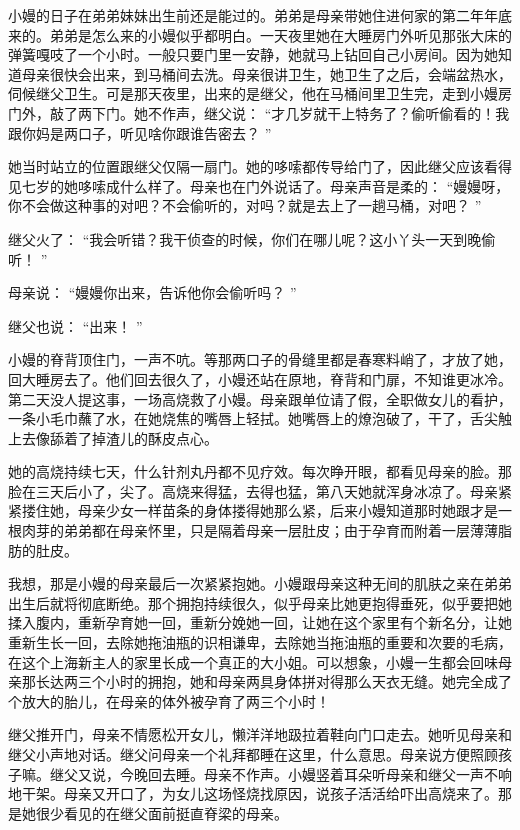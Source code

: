 \documentclass[12pt,twoside,openany]{book}
\begin{document}
小嫚的日子在弟弟妹妹出生前还是能过的。弟弟是母亲带她住进何家的第二年年底来的。弟弟是怎么来的小嫚似乎都明白。一天夜里她在大睡房门外听见那张大床的弹簧嘎吱了一个小时。一般只要门里一安静，她就马上钻回自己小房间。因为她知道母亲很快会出来，到马桶间去洗。母亲很讲卫生，她卫生了之后，会端盆热水，伺候继父卫生。可是那天夜里，出来的是继父，他在马桶间里卫生完，走到小嫚房门外，敲了两下门。她不作声，继父说： “才几岁就干上特务了？偷听偷看的！我跟你妈是两口子，听见啥你跟谁告密去？ ”

她当时站立的位置跟继父仅隔一扇门。她的哆嗦都传导给门了，因此继父应该看得见七岁的她哆嗦成什么样了。母亲也在门外说话了。母亲声音是柔的： “嫚嫚呀，你不会做这种事的对吧？不会偷听的，对吗？就是去上了一趟马桶，对吧？ ”

继父火了： “我会听错？我干侦查的时候，你们在哪儿呢？这小丫头一天到晚偷听！ ”

母亲说： “嫚嫚你出来，告诉他你会偷听吗？ ”

继父也说： “出来！ ”

小嫚的脊背顶住门，一声不吭。等那两口子的骨缝里都是春寒料峭了，才放了她，回大睡房去了。他们回去很久了，小嫚还站在原地，脊背和门扉，不知谁更冰冷。第二天没人提这事，一场高烧救了小嫚。母亲跟单位请了假，全职做女儿的看护，一条小毛巾蘸了水，在她烧焦的嘴唇上轻拭。她嘴唇上的燎泡破了，干了，舌尖触上去像舔着了掉渣儿的酥皮点心。

她的高烧持续七天，什么针剂丸丹都不见疗效。每次睁开眼，都看见母亲的脸。那脸在三天后小了，尖了。高烧来得猛，去得也猛，第八天她就浑身冰凉了。母亲紧紧搂住她，母亲少女一样苗条的身体搂得她那么紧，后来小嫚知道那时她跟才是一根肉芽的弟弟都在母亲怀里，只是隔着母亲一层肚皮；由于孕育而附着一层薄薄脂肪的肚皮。

我想，那是小嫚的母亲最后一次紧紧抱她。小嫚跟母亲这种无间的肌肤之亲在弟弟出生后就将彻底断绝。那个拥抱持续很久，似乎母亲比她更抱得垂死，似乎要把她揉入腹内，重新孕育她一回，重新分娩她一回，让她在这个家里有个新名分，让她重新生长一回，去除她拖油瓶的识相谦卑，去除她当拖油瓶的重要和次要的毛病，在这个上海新主人的家里长成一个真正的大小姐。可以想象，小嫚一生都会回味母亲那长达两三个小时的拥抱，她和母亲两具身体拼对得那么天衣无缝。她完全成了个放大的胎儿，在母亲的体外被孕育了两三个小时！

继父推开门，母亲不情愿松开女儿，懒洋洋地趿拉着鞋向门口走去。她听见母亲和继父小声地对话。继父问母亲一个礼拜都睡在这里，什么意思。母亲说方便照顾孩子嘛。继父又说，今晚回去睡。母亲不作声。小嫚竖着耳朵听母亲和继父一声不响地干架。母亲又开口了，为女儿这场怪烧找原因，说孩子活活给吓出高烧来了。那是她很少看见的在继父面前挺直脊梁的母亲。
\end{document}
